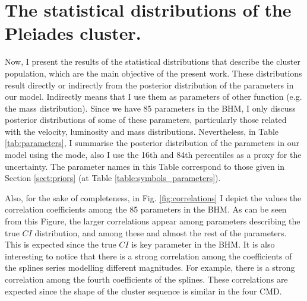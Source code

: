 \section{The statistical distributions of the Pleiades cluster.}
Now, I present the results of the statistical distributions that describe the cluster population, which are the main objective of the present work. These distributions result directly or indirectly from the posterior distribution of the parameters in our model. Indirectly means that I use them as parameters of other function (e.g. the mass distribution). Since we have 85 parameters in the BHM, I only discuss posterior distributions of some of these parameters, particularly those related with the velocity, luminosity and mass distributions. Nevertheless, in Table \ref{tab:parameters}, I summarise the posterior distribution of the parameters in our model using the mode, also I use the 16th and 84th percentiles as a proxy for the uncertainty. The parameter names in this Table correspond to those given in Section \ref{sect:priors} (at Table \ref{table:symbols_parameters}). 

Also, for the sake of completeness, in Fig. \ref{fig:correlations} I depict the values the correlation coefficients among the 85 parameters in the BHM. As can be seen from this Figure, the larger correlations appear among parameters describing the true $CI$ distribution, and  among these and almost the rest of the parameters. This is expected since the true $CI$ is key parameter in the BHM. It is also interesting to notice that there is a strong correlation among the coefficients of the splines series modelling different magnitudes. For example, there is a strong correlation among the fourth coefficients of the splines. These correlations are expected since the shape of the cluster sequence is similar in the four CMD.  



